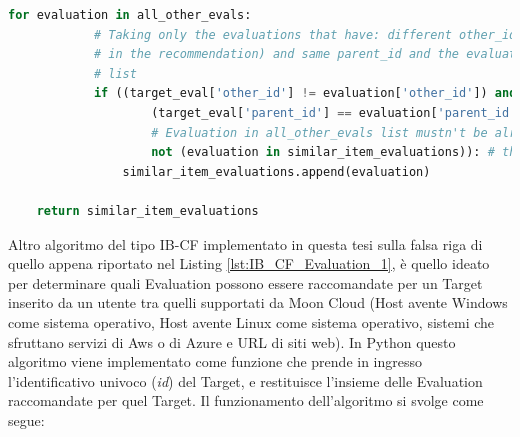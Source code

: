 \begin{itemize}
\begin{lstlisting}[language=Python, label=lst:IB_CF_Evaluation_3]
        for evaluation in all_other_evals:
            # Taking only the evaluations that have: different other_id (excluding the target evaluation
            # in the recommendation) and same parent_id and the evaluations that weren't added to similar_item_evaluations
            # list
            if ((target_eval['other_id'] != evaluation['other_id']) and  # Evaluations must have different 'other_id'
                    (target_eval['parent_id'] == evaluation['parent_id']) and  # Evaluations must have same 'parent_id'
                    # Evaluation in all_other_evals list mustn't be already added to \
                    not (evaluation in similar_item_evaluations)): # the 'similar_item_evaluations' list
                similar_item_evaluations.append(evaluation)
    
    return similar_item_evaluations 
    \end{lstlisting}
\end{itemize}
%
Altro algoritmo del tipo IB-CF implementato in questa tesi sulla falsa riga di quello appena riportato nel Listing \ref{lst:IB_CF_Evaluation_1}, 
è quello ideato per determinare quali Evaluation possono essere raccomandate per un Target inserito da un utente tra quelli supportati da Moon Cloud
(Host avente Windows come sistema operativo, Host avente Linux come sistema operativo, sistemi che sfruttano 
servizi di Aws o di Azure e URL di siti web).\hfill\break
In Python questo algoritmo viene implementato come funzione che prende in ingresso l'identificativo univoco (\textit{id}) del Target, e 
restituisce l'insieme delle Evaluation raccomandate per quel Target. Il funzionamento dell'algoritmo si svolge come segue:
